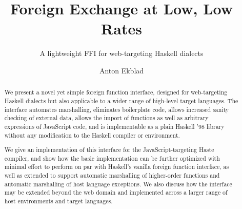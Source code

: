 \documentclass{sigplanconf}
\begin{document}
\setlength{\pdfpageheight}{\paperheight}
\setlength{\pdfpagewidth}{\paperwidth}







\author{
  \alignauthor
  Anton Ekblad
}

\title{Foreign Exchange at Low, Low Rates}
\subtitle{A lightweight FFI for web-targeting Haskell dialects}

\maketitle

\begin{abstract}
  We present a novel yet simple foreign function interface, designed for
  web-targeting Haskell dialects but also applicable to a wider range of
  high-level target languages.
  The interface automates marshalling, eliminates boilerplate
  code, allows increased sanity checking of external data,
  allows the import of functions as well as arbitrary expressions of
  JavaScript code, and is implementable as a plain Haskell '98 library
  without any modification to the Haskell compiler or environment.
  
  We give an implementation of this interface for the JavaScript-targeting
  Haste compiler, and show how the basic implementation can be
  further optimized with minimal effort to perform on par with Haskell's
  vanilla foreign function interface, as well as extended to support automatic
  marshalling of higher-order functions and automatic marshalling of host
  language exceptions.
  We also discuss how the interface may be extended beyond the web domain and
  implemented across a larger range of host environments and target languages.
\end{abstract}
\end{document}
